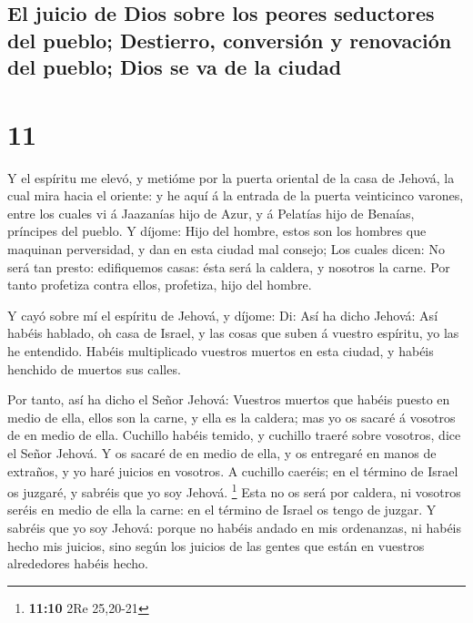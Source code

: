 \hypertarget{el-juicio-de-dios-sobre-los-peores-seductores-del-pueblo-destierro-conversiuxf3n-y-renovaciuxf3n-del-pueblo-dios-se-va-de-la-ciudad}{%
\subsection{El juicio de Dios sobre los peores seductores del pueblo;
Destierro, conversión y renovación del pueblo; Dios se va de la
ciudad}\label{el-juicio-de-dios-sobre-los-peores-seductores-del-pueblo-destierro-conversiuxf3n-y-renovaciuxf3n-del-pueblo-dios-se-va-de-la-ciudad}}

\hypertarget{section-10}{%
\section{11}\label{section-10}}

 Y el espíritu me elevó, y metióme por la puerta oriental de
la casa de Jehová, la cual mira hacia el oriente: y he aquí á la entrada
de la puerta veinticinco varones, entre los cuales vi á Jaazanías hijo
de Azur, y á Pelatías hijo de Benaías, príncipes del pueblo.
 Y díjome: Hijo del hombre, estos son los hombres que
maquinan perversidad, y dan en esta ciudad mal consejo;  Los
cuales dicen: No será tan presto: edifiquemos casas: ésta será la
caldera, y nosotros la carne.  Por tanto profetiza contra
ellos, profetiza, hijo del hombre.

 Y cayó sobre mí el espíritu de Jehová, y díjome: Di: Así ha
dicho Jehová: Así habéis hablado, oh casa de Israel, y las cosas que
suben á vuestro espíritu, yo las he entendido.  Habéis
multiplicado vuestros muertos en esta ciudad, y habéis henchido de
muertos sus calles.

 Por tanto, así ha dicho el Señor Jehová: Vuestros muertos
que habéis puesto en medio de ella, ellos son la carne, y ella es la
caldera; mas yo os sacaré á vosotros de en medio de ella. 
Cuchillo habéis temido, y cuchillo traeré sobre vosotros, dice el Señor
Jehová.  Y os sacaré de en medio de ella, y os entregaré en
manos de extraños, y yo haré juicios en vosotros.  A
cuchillo caeréis; en el término de Israel os juzgaré, y sabréis que yo
soy Jehová. \footnote{\textbf{11:10} 2Re 25,20-21}  Esta no
os será por caldera, ni vosotros seréis en medio de ella la carne: en el
término de Israel os tengo de juzgar.  Y sabréis que yo soy
Jehová: porque no habéis andado en mis ordenanzas, ni habéis hecho mis
juicios, sino según los juicios de las gentes que están en vuestros
alrededores habéis hecho.

